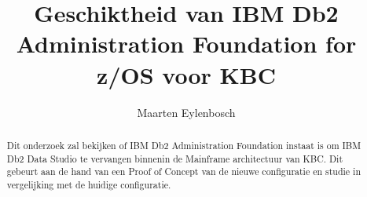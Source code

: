 \documentclass{hogent-article}
\title{Geschiktheid van IBM Db2 Administration Foundation for z/OS voor KBC}
\author{Maarten Eylenbosch}
\begin{document}
\begin{abstract}
Dit onderzoek zal bekijken of IBM Db2 Administration Foundation instaat is om IBM Db2 Data Studio te vervangen binnenin de Mainframe architectuur van KBC. Dit gebeurt aan de hand van een Proof of Concept van de nieuwe configuratie en studie in vergelijking met de huidige configuratie. 
\end{abstract}

\tableofcontents



\printbibliography[heading=bibintoc]
\end{document}
